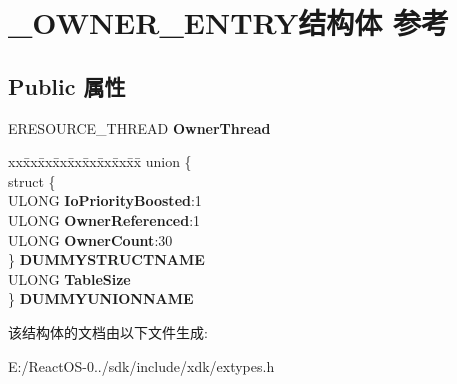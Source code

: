 \hypertarget{struct___o_w_n_e_r___e_n_t_r_y}{}\section{\+\_\+\+O\+W\+N\+E\+R\+\_\+\+E\+N\+T\+R\+Y结构体 参考}
\label{struct___o_w_n_e_r___e_n_t_r_y}
\subsection*{Public 属性}
\begin{DoxyCompactItemize}
\item 
\mbox{\label{struct___o_w_n_e_r___e_n_t_r_y_a9a643b624d7b15df46770d736a0ffd9f}} 
E\+R\+E\+S\+O\+U\+R\+C\+E\+\_\+\+T\+H\+R\+E\+AD {\bfseries Owner\+Thread}
\item 
\mbox{\label{struct___o_w_n_e_r___e_n_t_r_y_a4709e602b25f1ebbdb8f6ac85b6a66c5}} 
\begin{tabbing}
xx\=xx\=xx\=xx\=xx\=xx\=xx\=xx\=xx\=\kill
union \{\\
\>struct \{\\
\>\>ULONG {\bfseries IoPriorityBoosted}:1\\
\>\>ULONG {\bfseries OwnerReferenced}:1\\
\>\>ULONG {\bfseries OwnerCount}:30\\
\>\} {\bfseries DUMMYSTRUCTNAME}\\
\>ULONG {\bfseries TableSize}\\
\} {\bfseries DUMMYUNIONNAME}\\

\end{tabbing}\end{DoxyCompactItemize}


该结构体的文档由以下文件生成\+:\begin{DoxyCompactItemize}
\item 
E\+:/\+React\+O\+S-\/0../sdk/include/xdk/extypes.\+h\end{DoxyCompactItemize}
